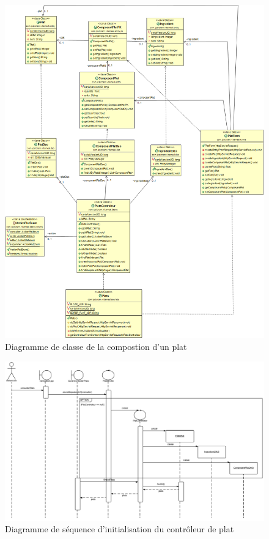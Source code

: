 \begin{figure}
\centering
\includegraphics[scale=0.4]{../../CasDUtilisations/CompositionPlat/classDiagram_ComposerPlat.png}
\caption{Diagramme de classe de la compostion d'un plat}
\label{DiagrammeClassComposerPlat}
\end{figure}

\begin{figure}
\centering
\includegraphics[scale=0.15]{../../CasDUtilisations/CompositionPlat/sequence_InitialisationPlatControleur.png}
\caption{Diagramme de séquence d'initialisation du contrôleur de plat}
\label{SequenceInitPlatControleur}
\end{figure}

